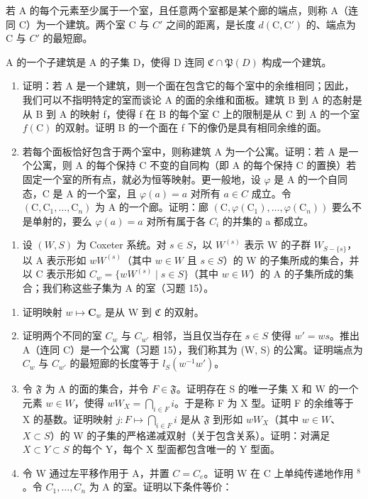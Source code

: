 若 A 的每个元素至少属于一个室，且任意两个室都是某个廊的端点，则称 A（连同 C）为一个建筑。两个室 C 与 \(C'\) 之间的距离，是长度 \(d(\mathrm{C},\mathrm{C}')\) 的、端点为 C 与 \(C'\) 的最短廊。

A 的一个子建筑是 A 的子集 D，使得 D 连同 \(\mathfrak{C}\cap\mathfrak{P}(D)\) 构成一个建筑。

\begin{enumerate}
\def\labelenumi{\alph{enumi})}
\item
  证明：若 A 是一个建筑，则一个面在包含它的每个室中的余维相同；因此，我们可以不指明特定的室而谈论 A 的面的余维和面板。建筑 B 到 A 的态射是从 B 到 A 的映射 f，使得 f 在 B 的每个室 C 上的限制是从 C 到 A 的一个室 \(f(\mathrm{C})\) 的双射。证明 B 的一个面在 f 下的像仍是具有相同余维的面。
\item
  若每个面板恰好包含于两个室中，则称建筑 A 为一个公寓。证明：若 A 是一个公寓，则 A 的每个保持 C 不变的自同构（即 A 的每个保持 C 的置换）若固定一个室的所有点，就必为恒等映射。更一般地，设 \(\varphi\) 是 A 的一个自同态，C 是 A 的一个室，且 \(\varphi(a)=a\) 对所有 \(a\in C\) 成立。令 \((\mathrm{C},\mathrm{C}_{1},\ldots,\mathrm{C}_{n})\) 为 A 的一个廊。证明：廊 \((\mathrm{C},\varphi(\mathrm{C}_{1}),\ldots,\varphi(\mathrm{C}_{n}))\) 要么不是单射的，要么 \(\varphi(a)=a\) 对所有属于各 \(C_{i}\) 的并集的 a 都成立。
\end{enumerate}

\begin{enumerate}
\def\labelenumi{\arabic{enumi})}
\setcounter{enumi}{15}
\tightlist
\item
  设 \((W,S)\) 为 Coxeter 系统。对 \(s \in S\)，以 \(W^{(s)}\) 表示 W 的子群 \(W_{S-\{s\}}\)，以 A 表示形如 \(wW^{(s)}\)（其中 \(w \in W\) 且 \(s \in S\)）的 W 的子集所成的集合，并以 C 表示形如 \(C_w = \{wW^{(s)} \mid s \in S\}\)（其中 \(w \in W\)）的 A 的子集所成的集合；我们称这些子集为 A 的室（习题 15）。
\end{enumerate}

\begin{enumerate}
\def\labelenumi{\alph{enumi})}
\item
  证明映射 \(w \mapsto \mathbf{C}_w\) 是从 W 到 \(\mathfrak{C}\) 的双射。
\item
  证明两个不同的室 \(C_{w}\) 与 \(C_{w'}\) 相邻，当且仅当存在 \(s \in S\) 使得 \(w' = ws\)。推出 A（连同 C）是一个公寓（习题 15），我们称其为 (W, S) 的公寓。证明端点为 \(C_{w}\) 与 \(C_{w'}\) 的最短廊的长度等于 \(l_{S}(w^{-1}w')\)。
\item
  令 \(\mathfrak{F}\) 为 A 的面的集合，并令 \(F \in \mathfrak{F}\)。证明存在 S 的唯一子集 X 和 W 的一个元素 \(w \in W\)，使得 \(wW_X = \bigcap_{i \in F} i\)。于是称 F 为 X 型。证明 F 的余维等于 X 的基数。证明映射 \(j: F \mapsto \bigcap_{i \in F} i\) 是从 \(\mathfrak{F}\) 到形如 \(wW_X\)（其中 \(w \in W\)、\(X \subset S\)）的 W 的子集的严格递减双射（关于包含关系）。证明：对满足 \(X \subset Y \subset S\) 的每个 Y，每个 X 型面都包含唯一的 Y 型面。
\item
  令 W 通过左平移作用于 A，并置 \(C = C_{e}\)。证明 W 在 C 上单纯传递地作用 \(^{8}\)。令 \(C_{1}, \ldots, C_{n}\) 为 A 的室。证明以下条件等价：
\end{enumerate}

